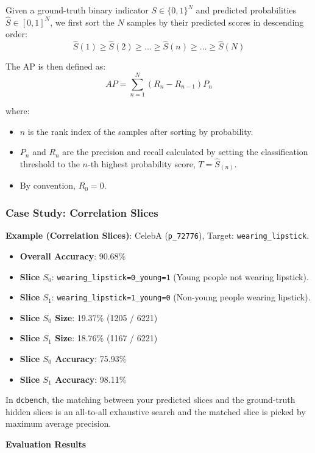 Given a ground-truth binary indicator $S \in \{0, 1\}^N$ and predicted probabilities $\hat{S} \in [0, 1]^N$, we first sort the
  $N$ samples by their predicted scores in descending order:
  \[ \hat{S}{(1)} \ge \hat{S}{(2)} \ge \dots \ge \hat{S}{(n)} \ge \dots \ge \hat{S}{(N)} \]


  The AP is then defined as:
  \[ AP = \sum_{n=1}^{N} (R_n - R_{n-1}) P_n \]


  where:
  \begin{itemize}
      \item $n$ is the rank index of the samples after sorting by probability.
      \item $P_n$ and $R_n$ are the precision and recall calculated by setting the classification threshold to the $n$-th highest probability score, $T = \hat{S}_{(n)}$.
      \item By convention, $R_0 = 0$.
  \end{itemize}


\subsubsection{Case Study: Correlation Slices}
\noindent\textbf{Example (Correlation Slices)}: CelebA (\texttt{p\_72776}), Target: \texttt{wearing\_lipstick}.
\begin{itemize}
    \item \textbf{Overall Accuracy}: 90.68\%
    \item \textbf{Slice $S_0$}: \texttt{wearing\_lipstick=0\_young=1} (Young people not wearing lipstick).
    \item \textbf{Slice $S_1$}: \texttt{wearing\_lipstick=1\_young=0} (Non-young people wearing lipstick).
    \item \textbf{Slice $S_0$ Size}: 19.37\% (1205 / 6221)
    \item \textbf{Slice $S_1$ Size}: 18.76\% (1167 / 6221)
    \item \textbf{Slice $S_0$ Accuracy}: 75.93\%
    \item \textbf{Slice $S_1$ Accuracy}: 98.11\%
\end{itemize}

In \texttt{dcbench}, the matching between your predicted slices and the ground-truth hidden slices is an all-to-all exhaustive search and the matched slice is picked by maximum average precision.

\noindent\textbf{Evaluation Results}

